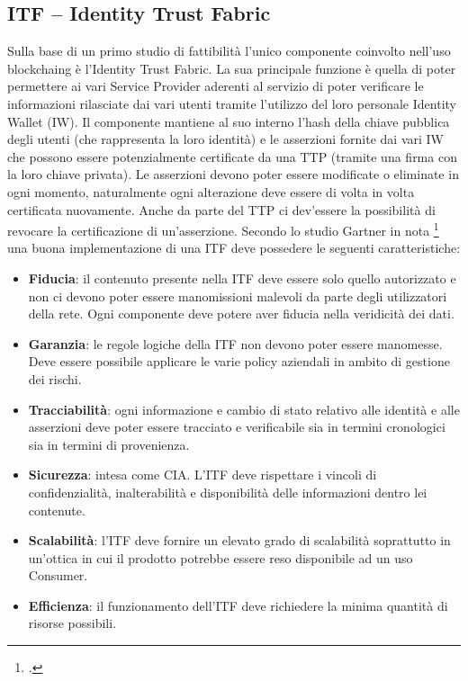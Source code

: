 \subsection{ITF – Identity Trust Fabric}
Sulla base di un primo studio di fattibilità l’unico componente coinvolto nell’uso \gls{blockchaing} è l’Identity Trust Fabric. La sua principale funzione è quella di poter permettere ai vari Service Provider aderenti al servizio di poter verificare le informazioni rilasciate dai vari utenti tramite l’utilizzo del loro personale Identity Wallet (IW). Il componente mantiene al suo interno l’hash della chiave pubblica degli utenti (che rappresenta la loro identità) e le asserzioni fornite dai vari IW che possono essere potenzialmente certificate da una TTP (tramite una firma con la loro chiave privata). Le asserzioni devono poter essere modificate o eliminate in ogni momento, naturalmente ogni alterazione deve essere di volta in volta certificata nuovamente. Anche da parte del TTP ci dev’essere la possibilità di revocare la certificazione di un’asserzione. 
Secondo lo studio Gartner in nota \footcite{farah:The-Dawn-of-Decentralized-Identity} una buona implementazione di una ITF deve possedere le seguenti caratteristiche:
\begin{itemize}
    \item \textbf{Fiducia}: il contenuto presente nella ITF deve essere solo quello autorizzato e non ci devono poter essere manomissioni malevoli da parte degli utilizzatori della rete. Ogni componente deve potere aver fiducia nella veridicità dei dati.
    \item \textbf{Garanzia}: le regole logiche della ITF non devono poter essere manomesse. Deve essere possibile applicare le varie policy aziendali in ambito di gestione dei rischi.
    \item \textbf{Tracciabilità}: ogni informazione e cambio di stato relativo alle identità e alle asserzioni deve poter essere tracciato e verificabile sia in termini cronologici sia in termini di provenienza. 
    \item \textbf{Sicurezza}: intesa come CIA. L’ITF deve rispettare i vincoli di confidenzialità, inalterabilità e disponibilità delle informazioni dentro lei contenute.
    \item \textbf{Scalabilità}: l’ITF deve fornire un elevato grado di scalabilità soprattutto in un’ottica in cui il prodotto potrebbe essere reso disponibile ad un uso Consumer.
    \item \textbf{Efficienza}: il funzionamento dell’ITF deve richiedere la minima quantità di risorse possibili.
\end{itemize}

